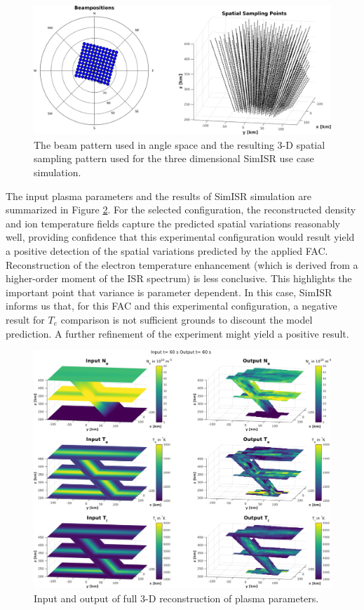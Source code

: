 \begin{figure}[!t]
\centering
\includegraphics[width=6in]{Sampling3d}
\caption{The beam pattern used in angle space and the resulting 3-D spatial sampling pattern used for the three dimensional SimISR use case simulation.}
\label{fig:3dsampling}
\end{figure}

The input plasma parameters and the results of SimISR simulation are summarized in Figure \ref{fig:3dparams}.  For the selected configuration, the reconstructed density and ion temperature fields capture the predicted spatial variations reasonably well, providing confidence that this experimental configuration would result yield a positive detection of the spatial variations predicted by the applied FAC.  Reconstruction of the electron temperature enhancement (which is derived from a higher-order moment of the ISR spectrum) is less conclusive. This highlights the important point that variance is parameter dependent. In this case, SimISR informs us that, for this FAC and this experimental configuration, a negative result for $T_e$ comparison is not sufficient grounds to discount the model prediction.  A further refinement of the experiment might yield a positive result.

\begin{figure}[!h]
\centering
\includegraphics[width=6in]{60_60}
\caption{Input and output of full 3-D reconstruction of plasma parameters.}
\label{fig:3dparams}
\end{figure}

